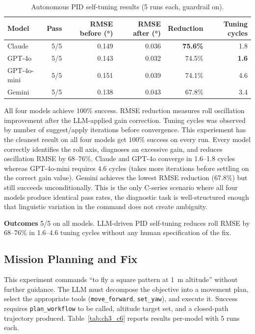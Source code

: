 \begin{table}[ht]
  \caption{Autonomous PID self-tuning results (5 runs each, guardrail on).}
  \label{tab:ch3_c5}
  \centering
  \small
  \begin{tabular}{lrrrrr}
    \toprule
    Model & Pass & RMSE before (°) & RMSE after (°) & Reduction & Tuning cycles \\
    \midrule
    Claude      & 5/5 & 0.149 & 0.036 & \textbf{75.6\%} & 1.8 \\
    GPT-4o      & 5/5 & 0.143 & 0.032 & 74.5\% & \textbf{1.6} \\
    GPT-4o-mini & 5/5 & 0.151 & 0.039 & 74.1\% & 4.6 \\
    Gemini      & 5/5 & 0.138 & 0.043 & 67.8\% & 3.4 \\
    \bottomrule
  \end{tabular}
\end{table}
All four models achieve 100\% success. 
RMSE reduction measures roll oscillation improvement after the LLM-applied gain correction.
Tuning cycles was observed by number of suggest/apply iterations before convergence.
This experiement has the cleanest result on all four models get 100\% success on every run. 
Every model correctly identifies the roll axis, diagnoses an excessive gain, and reduces oscillation RMSE by 68--76\%.
Claude and GPT-4o converge in 1.6--1.8 cycles whereas GPT-4o-mini requires 4.6 cycles (takes more iterations before settling on the correct gain value).
Gemini achieves the lowest RMSE reduction (67.8\%) but still succeeds unconditionally. 
This is the only C-series scenario where all four models
produce identical pass rates, the diagnostic task is well-structured enough that linguistic variation in the command does not create ambiguity.

\textbf{Outcomes} 5/5 on all models. 
LLM-driven PID self-tuning reduces roll RMSE by 68--76\% in 1.6--4.6 tuning cycles without any human specification of the fix.

\subsection{Mission Planning and Fix}
\label{sec:ch3_c6}

This experiment commands ``to fly a square pattern at 1~m altitude'' without further guidance. 
The LLM must decompose the objective into a movement plan,
select the appropriate tools (\texttt{move\_forward}, \texttt{set\_yaw}), and execute it. 
Success requires \texttt{plan\_workflow} to be called,
altitude target set, and a closed-path trajectory produced.
Table~\ref{tab:ch3_c6} reports results per-model with 5 runs each.

